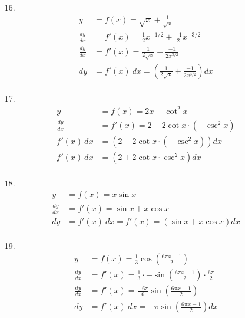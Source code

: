 \documentclass[12pt]{article}
\begin{document}
\begin{enumerate}
        \item[16.] 
            \begin{align*}
            y &= f(x) = \sqrt{x}+\frac{1}{\sqrt{x}} \\
            \frac{dy}{dx} &= f'(x) = \frac{1}{2}x^{-1/2} + \frac{-1}{2}x^{-3/2}\\
            \frac{dy}{dx} &= f'(x) = \frac{1}{2\sqrt{x}} + \frac{-1}{2x^{3/2}}\\
            dy &= f'(x)~dx = \left(\frac{1}{2\sqrt{x}} + \frac{-1}{2x^{3/2}} \right)dx\\
            \end{align*}

        \item[17.] 
            \begin{align*}
            y &= f(x) = 2x - \cot^2{x} \\
            \frac{dy}{dx} &= f'(x) = 2 - 2\cot{x}\cdot(-\csc^2{x})\\
            f'(x)~dx &= \left(2 - 2\cot{x}\cdot(-\csc^2{x})\right)dx\\
            f'(x)~dx &= \left(2 + 2\cot{x}\cdot\csc^2{x}\right)dx\\
            \end{align*}

        \item[18.] 
            \begin{align*}
            y &= f(x) = x\sin{x} \\
            \frac{dy}{dx} &= f'(x) =  \sin{x} + x\cos{x}\\
            dy &= f'(x)~dx = f'(x) =  \left( \sin{x} + x\cos{x} \right)dx\\
            \end{align*}

        \item[19.] 
            \begin{align*}
            y &= f(x) = \frac{1}{3}\cos\left({\frac{6\pi x - 1}{2}}\right) \\
            \frac{dy}{dx} &= f'(x) = \frac{1}{3} \cdot -\sin{\left(\frac{6\pi x - 1}{2}\right)} \cdot \frac{6\pi}{2}\\
            \frac{dy}{dx} &= f'(x) = \frac{-6\pi}{6} \sin{\left(\frac{6\pi x - 1}{2}\right)}\\
            dy &= f'(x)~dx = -\pi\sin{\left(\frac{6\pi x - 1}{2}\right)}dx\\
            \end{align*}


\end{enumerate}
\end{document}
